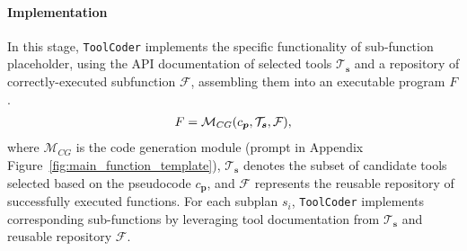 \paragraph{Implementation}
In this stage, \texttt{ToolCoder} implements the specific functionality of sub-function placeholder, using the API documentation of selected tools $\mathcal{T}_{\boldsymbol{s}}$ and a repository of correctly-executed subfunction $\mathcal{F}$, assembling them into an executable program $F$.
\begin{equation}
\textstyle
\setlength\abovedisplayskip{0.2cm}
\setlength\belowdisplayskip{0.2cm}
\begin{aligned}
F = \mathcal{M}_{CG}(c_{\boldsymbol{p}}, \mathcal{T}_{\boldsymbol{s}}, \mathcal{F}),  
\end{aligned}
\end{equation} 
where $\mathcal{M}_{CG}$ is the code generation module (prompt in Appendix Figure~\ref{fig:main_function_template}), $\mathcal{T}_{\boldsymbol{s}}$ denotes the subset of candidate tools selected based on the pseudocode $c_{\boldsymbol{p}}$, and $\mathcal{F}$ represents the reusable repository of successfully executed functions. 
For each subplan $s_i$, \texttt{ToolCoder} implements corresponding sub-functions by leveraging tool documentation from $\mathcal{T}_{\boldsymbol{s}}$ and reusable repository $\mathcal{F}$.

